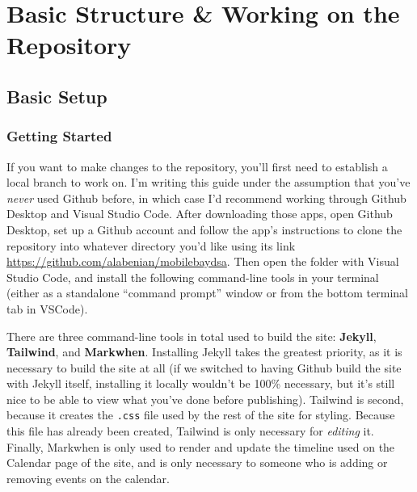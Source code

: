 \documentclass[
]{book}
\begin{document}
\part{Basic Structure \& Working on the Repository}\label{part-basic-structure-working-on-the-repository}

\chapter{Basic Setup}\label{basic-setup}

\section{Getting Started}\label{getting-started}

If you want to make changes to the repository, you'll first need to establish a local branch to work on. I'm writing this guide under the assumption that you've \emph{never} used Github before, in which case I'd recommend working through Github Desktop and Visual Studio Code. After downloading those apps, open Github Desktop, set up a Github account and follow the app's instructions to clone the repository into whatever directory you'd like using its link \url{https://github.com/alabenian/mobilebaydsa}. Then open the folder with Visual Studio Code, and install the following command-line tools in your terminal (either as a standalone ``command prompt'' window or from the bottom terminal tab in VSCode).

There are three command-line tools in total used to build the site: \textbf{Jekyll}, \textbf{Tailwind}, and \textbf{Markwhen}. Installing Jekyll takes the greatest priority, as it is necessary to build the site at all (if we switched to having Github build the site with Jekyll itself, installing it locally wouldn't be 100\% necessary, but it's still nice to be able to view what you've done before publishing). Tailwind is second, because it creates the \texttt{.css} file used by the rest of the site for styling. Because this file has already been created, Tailwind is only necessary for \emph{editing} it. Finally, Markwhen is only used to render and update the timeline used on the Calendar page of the site, and is only necessary to someone who is adding or removing events on the calendar.
\end{document}
